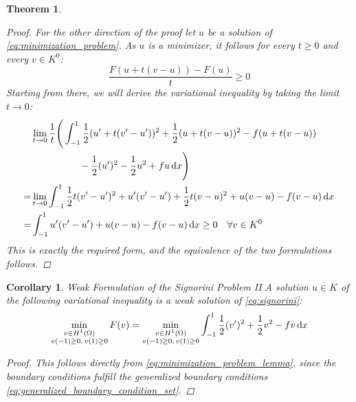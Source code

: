 \documentclass[headsepline,footsepline,footinclude=false,oneside,fontsize=11pt,paper=a4,listof=totoc,bibliography=totoc]{scrbook} %
\newtheorem{theorem}{Theorem}
\newtheorem{corollary}{Corollary}
\begin{document}
\begin{theorem}
\begin{proof}
	For the other direction of the proof let $u$ be a solution of \eqref{eq:minimization_problem}. As $u$ is a minimizer, it follows for every $t \geq 0$ and every $v \in K^0$:
	\begin{equation*}
	\frac{F(u+t(v-u)) - F(u)}{t} \geq 0
	\end{equation*}
	Starting from there, we will derive the variational inequality by taking the limit $t\rightarrow 0$:
	\begingroup
	\allowdisplaybreaks
	\begin{align*}
	&\lim\limits_{t \rightarrow 0} \frac{1}{t} \Bigg( 
	\int_{-1}^{1} \frac{1}{2} (u'+t(v'-u'))^2 + \frac{1}{2} (u+t(v-u))^2 - f(u+t(v-u))\\
	 &\phantom{\lim\limits_{t \rightarrow 0} \frac{1}{t} \Bigg( 
		\int_{-1}^{1}} -\frac{1}{2}(u')^2  - \frac{1}{2}u^2 + fu \dif x \Bigg) \\
	= &\lim\limits_{t \rightarrow 0} \int_{-1}^1 \frac{1}{2} t(v'-u')^2 + u'(v'-u') + \frac{1}{2}t(v-u)^2 + u(v-u) -f(v-u) \dif x \\
	= & 	\int_{-1}^1 u'(v'-u') + u(v-u) - f(v-u) \dif x \geq 0 \quad \forall v \in K^0
	\end{align*}
	\endgroup
	This is exactly the required form, and the equivalence of the two formulations follows.
	\end{proof}
\end{theorem}

\begin{corollary} Weak Formulation of the Signorini Problem II\newline
	A solution $u \in K$ of the following variational inequality is a weak solution of \eqref{eq:signorini}:
	\begin{equation} \label{eq:minimization_problem}
	\min_{\substack{v \in H^1(\Omega) \\ v(-1) \geq 0,\, v(1) \geq 0}} F(v) = \min_{\substack{v \in H^1(\Omega) \\ v(-1) \geq 0,\, v(1) \geq 0}} \int_{-1}^1{\frac{1}{2} (v')^2 + \frac{1}{2} v^2 - fv \dif x} 
	\end{equation}
	\begin{proof}
	This follows directly from \eqref{eq:minimization_problem_lemma}, since the boundary conditions fulfill the generalized boundary conditions \eqref{eq:generalized_boundary_condition_set}.
	\end{proof}
\end{corollary}
\end{document}

